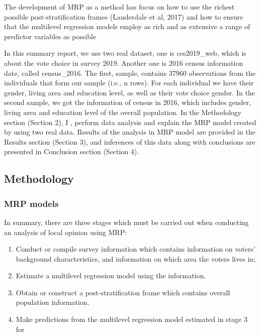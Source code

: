 \documentclass[
]{article}
\begin{document}
The development of MRP as a method has focus on how to use the richest
possible post-stratification frames (Lauderdale et al, 2017) and how to
ensure that the multilevel regression models employ as rich and as
extensive a range of predictor variables as possible

In this summary report, we use two real dataset, one is ces2019\_web,
which is about the vote choice in survey 2019. Another one is 2016
census information date, called census\_2016. The first, sample,
contains 37960 observations from the individuals that form our sample
(i.e., n rows). For each individual we have their gender, living area
and education level, as well as their vote choice gender. In the second
sample, we got the information of census in 2016, which includes gender,
living area and education level of the overall population. In the
Methodology section (Section 2), I , perform data analysis and explain
the MRP model created by using two real data. Results of the analysis in
MRP model are provided in the Results section (Section 3), and
inferences of this data along with conclusions are presented in
Conclusion section (Section 4).

\hypertarget{methodology}{%
\subsection{Methodology}\label{methodology}}

\hypertarget{mrp-models}{%
\subsubsection{MRP models}\label{mrp-models}}

In summary, there are three stages which must be carried out when
conducting an analysis of local opinion using MRP:

\begin{enumerate}
\def\labelenumi{\arabic{enumi}.}
\item
  Conduct or compile survey information which contains information on
  voters' background characteristics, and information on which area the
  voters lives in;
\item
  Estimate a multilevel regression model using the information.
\item
  Obtain or construct a post-stratification frame which contains overall
  population information.
\item
  Make predictions from the multilevel regression model estimated in
  stage 3 for
\end{enumerate}
\end{document}
